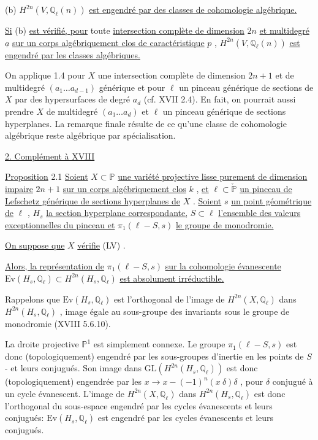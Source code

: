 (b) $H^{2n}(V, \mathbb{Q}_\ell(n))$ \underline{est engendré par des classes de cohomologie algébrique.}

\underline{Si} (b) \underline{est vérifié, pour} toute \underline{intersection complète de dimension} $2n$ \underline{et multidegré} $\underline{a}$ \underline{sur un corps algébriquement clos de caractéristique} $p$ , $H^{2n}(V, \mathbb{Q}_\ell(n))$ \underline{est engendré par les classes algébriques.}

On applique 1.4 pour $X$ une intersection complète de dimension $2n+1$ et de multidegré $(a_1 \ldots a_{d-1})$ générique et pour $\ell$ un pinceau générique de sections de $X$ par des hypersurfaces de degré $a_d$ (cf. XVII 2.4). En fait, on pourrait aussi prendre $X$ de multidegré $(a_1 \ldots a_d)$ et $\ell$ un pinceau générique de sections hyperplanes. La remarque finale résulte de ce qu'une classe de cohomologie algébrique reste algébrique par spécialisation.


\underline{2. Complément à XVIII}

\underline{Proposition} 2.1 \quad \underline{Soient} $X \subset \mathbb{P}$ \underline{une variété projective lisse purement de dimension impaire} $2n+1$ \underline{sur un corps algébriquement clos} $k$ , \underline{et} $\ell \subset \check{\mathbb{P}}$ \underline{un pinceau de Lefschetz générique de sections hyperplanes de} $X$ . \underline{Soient} $s$ \underline{un point géométrique de} $\ell$ , $H_s$ \underline{la section hyperplane correspondante,} $S \subset \ell$ \underline{l'ensemble des valeurs exceptionnelles du pinceau et} $\pi_1(\ell - S, s)$ \underline{le groupe de monodromie.}

\underline{On suppose que} $X$ \underline{vérifie} (LV) .

\underline{Alors, la représentation de} $\pi_1(\ell - S, s)$ \underline{sur la cohomologie évanescente} $\mathrm{Ev}(H_s, \mathbb{Q}_\ell) \subset H^{2n}(H_s, \mathbb{Q}_\ell)$ \underline{est absolument irréductible.}

Rappelons que $\mathrm{Ev}(H_s, \mathbb{Q}_\ell)$ est l'orthogonal de l'image de $H^{2n}(X, \mathbb{Q}_\ell)$ dans $H^{2n}(H_s, \mathbb{Q}_\ell)$ , image égale au sous-groupe des invariants sous le groupe de monodromie (XVIII 5.6.10).



La droite projective $\mathbb{P}^1$ est simplement connexe. Le groupe $\pi_1(\ell - S, s)$ est donc (topologiquement) engendré par les sous-groupes d'inertie en les points de $S$ - et leurs conjugués. Son image dans $\mathrm{GL}(H^{2n}(H_s, \mathbb{Q}_\ell))$ est donc (topologiquement) engendrée par les $x \longrightarrow x - (-1)^n(x\ \delta)\delta$ , pour $\delta$ conjugué à un cycle évanescent. L'image de $H^{2n}(X, \mathbb{Q}_\ell)$ dans $H^{2n}(H_s, \mathbb{Q}_\ell)$ est donc l'orthogonal du sous-espace engendré par les cycles évanescents et leurs conjugués: $\mathrm{Ev}(H_s, \mathbb{Q}_\ell)$ est engendré par les cycles évanescents et leurs conjugués.

